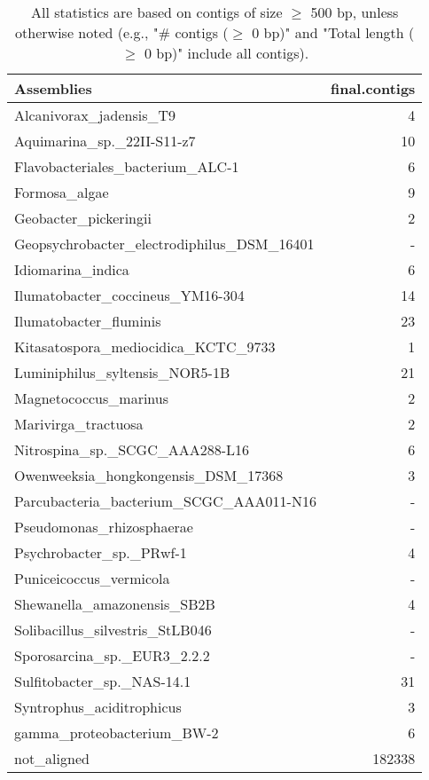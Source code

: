 \documentclass[12pt,a4paper]{article}
\begin{document}
\begin{table}[ht]
\begin{center}
\caption{All statistics are based on contigs of size $\geq$ 500 bp, unless otherwise noted (e.g., "\# contigs ($\geq$ 0 bp)" and "Total length ($\geq$ 0 bp)" include all contigs).}
\begin{tabular}{|l*{1}{|r}|}
\hline
Assemblies & final.contigs \\ \hline
Alcanivorax\_jadensis\_T9 & 4 \\ \hline
Aquimarina\_sp.\_22II-S11-z7 & 10 \\ \hline
Flavobacteriales\_bacterium\_ALC-1 & 6 \\ \hline
Formosa\_algae & 9 \\ \hline
Geobacter\_pickeringii & 2 \\ \hline
Geopsychrobacter\_electrodiphilus\_DSM\_16401 & - \\ \hline
Idiomarina\_indica & 6 \\ \hline
Ilumatobacter\_coccineus\_YM16-304 & 14 \\ \hline
Ilumatobacter\_fluminis & 23 \\ \hline
Kitasatospora\_mediocidica\_KCTC\_9733 & 1 \\ \hline
Luminiphilus\_syltensis\_NOR5-1B & 21 \\ \hline
Magnetococcus\_marinus & 2 \\ \hline
Marivirga\_tractuosa & 2 \\ \hline
Nitrospina\_sp.\_SCGC\_AAA288-L16 & 6 \\ \hline
Owenweeksia\_hongkongensis\_DSM\_17368 & 3 \\ \hline
Parcubacteria\_bacterium\_SCGC\_AAA011-N16 & - \\ \hline
Pseudomonas\_rhizosphaerae & - \\ \hline
Psychrobacter\_sp.\_PRwf-1 & 4 \\ \hline
Puniceicoccus\_vermicola & - \\ \hline
Shewanella\_amazonensis\_SB2B & 4 \\ \hline
Solibacillus\_silvestris\_StLB046 & - \\ \hline
Sporosarcina\_sp.\_EUR3\_2.2.2 & - \\ \hline
Sulfitobacter\_sp.\_NAS-14.1 & 31 \\ \hline
Syntrophus\_aciditrophicus & 3 \\ \hline
gamma\_proteobacterium\_BW-2 & 6 \\ \hline
not\_aligned & 182338 \\ \hline
\end{tabular}
\end{center}
\end{table}
\end{document}
